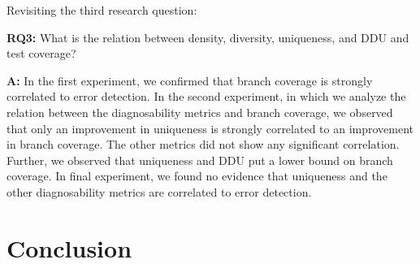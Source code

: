 \documentclass[twoside,a4paper,11pt]{memoir}
\begin{document}
Revisiting the third research question:
\begin{framed}
\noindent
\textbf{RQ3:} What is the relation between density, diversity, uniqueness, and DDU and test coverage?
\end{framed}
\textbf{A:} In the first experiment, we confirmed that branch coverage is strongly correlated to error detection.
In the second experiment, in which we analyze the relation between the diagnosability metrics and branch coverage, we observed that only an improvement in uniqueness is strongly correlated to an improvement in branch coverage.
The other metrics did not show any significant correlation.
Further, we observed that uniqueness and DDU put a lower bound on branch coverage.
In final experiment, we found no evidence that uniqueness and the other diagnosability metrics are correlated to error detection.

\chapter{Conclusion}%
\label{ch:conclusion}




\end{document}
